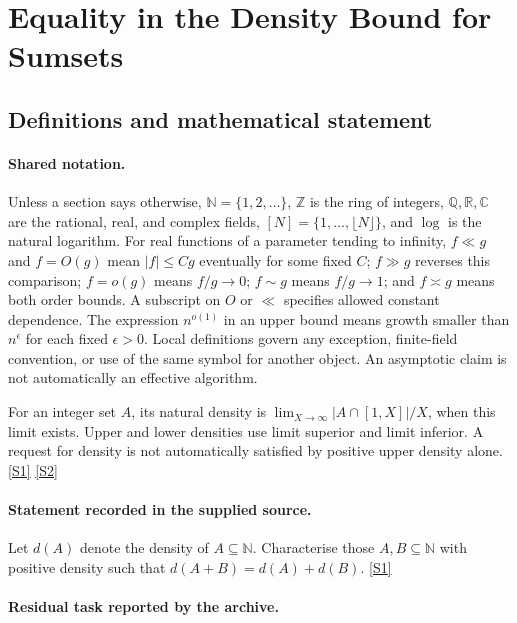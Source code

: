\documentclass[11pt,a4paper]{article}
\newcommand{\N}{\mathbb{N}}
\newcommand{\Z}{\mathbb{Z}}
\newcommand{\Q}{\mathbb{Q}}
\newcommand{\R}{\mathbb{R}}
\newcommand{\C}{\mathbb{C}}
\newcommand{\sref}[2]{\hyperlink{source:#1:#2}{[S#2]}}
\begin{document}
\section{Equality in the Density Bound for Sumsets}\label{statement}


\subsection{Definitions and mathematical statement}

\paragraph{Shared notation.}Unless a section says otherwise, $\N=\{1,2,\ldots\}$,
$\Z$ is the ring of integers, $\Q,\R,\C$ are the rational, real, and complex
fields, $[N]=\{1,\ldots,\lfloor N\rfloor\}$, and $\log$ is the natural
logarithm. For real functions of a parameter tending to infinity,
$f\ll g$ and $f=O(g)$ mean $|f|\leq Cg$ eventually for some fixed $C$;
$f\gg g$ reverses this comparison; $f=o(g)$ means $f/g\to0$;
$f\sim g$ means $f/g\to1$; and $f\asymp g$ means both order bounds.
A subscript on $O$ or $\ll$ specifies allowed constant dependence.
The expression $n^{o(1)}$ in an upper bound means growth smaller than
$n^\epsilon$ for each fixed $\epsilon>0$. Local definitions govern any
exception, finite-field convention, or use of the same symbol for another
object. An asymptotic claim is not automatically an effective algorithm.



For an integer set $A$, its natural density is $\lim_{X\to\infty}|A\cap[1,X]|/X$, when this limit exists. Upper and lower densities use limit superior and limit inferior. A request for density is not automatically satisfied by positive upper density alone. \sref{statement}{1} \sref{statement}{2}

\paragraph{Statement recorded in the supplied source.}
Let $d(A)$ denote the density of $A\subseteq \mathbb{N}$. Characterise those $A,B\subseteq \mathbb{N}$ with positive density such that $ d(A+B)=d(A)+d(B). $ \sref{statement}{1}

\paragraph{Residual task reported by the archive.}
\end{document}
